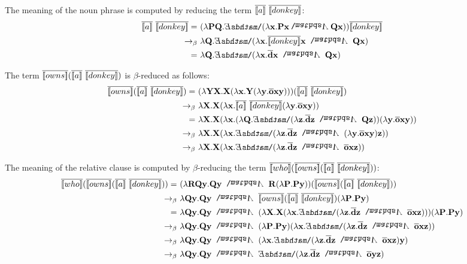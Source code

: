 The meaning of the noun phrase  is computed by reducing the term $\overline{[\![a]\!]} \ \overline{[\![donkey]\!]} $:
\begin{align*}
 \tr{\I{a}} \ \tr{\I{donkey}}   = \ & (\lambda \P2 \Q2. \ex2 (\lambda \x2.  \P2 \x2 \cnj2 \Q2 \x2 ) ) \tr{\I{donkey}}   \\
 \bconv \ &  \lambda  \Q2. \ex2 (\lambda \x2.  \tr{\I{donkey}} \x2 \ \cnj2 \ \Q2 \x2 ) \\
= \ &  \lambda  \Q2. \ex2 (\lambda \x2.  \tr{\cdonkey} \x2 \ \cnj2 \ \Q2 \x2 )
\end{align*}

The term $ \tr{\I{owns}}  (\tr{\I{a}} \ \tr{\I{donkey}}) $ is $\beta$-reduced as follows:
\begin{align*}
\tr{\I{owns}}  (\tr{\I{a}} \ \tr{\I{donkey}} ) = \ & ( \lambda \Y2 \X2. \X2 ( \lambda \x2. \Y2 (\lambda \y2.  \tr{\cown}  \x2 \y2 )))  (\tr{\I{a}} \ \tr{\I{donkey}} ) \\
\bconv \ &   \lambda \X2. \X2 ( \lambda \x2. \tr{\I{a}} \ \tr{\I{donkey}} (\lambda \y2.  \tr{\cown}  \x2 \y2 ))   \\
= \ &  \lambda \X2. \X2 ( \lambda \x2. ( \lambda  \Q2. \ex2 (\lambda \z2.  \tr{\cdonkey} \z2 \ \cnj2 \ \Q2 \z2 ) ) (\lambda \y2.  \tr{\cown}  \x2 \y2 ))   \\
\bconv \ &  \lambda \X2. \X2 ( \lambda \x2. \ex2 (\lambda \z2.  \tr{\cdonkey} \z2 \ \cnj2 \ (\lambda \y2.  \tr{\cown}  \x2 \y2 ) \z2   ))   \\
\bconv \ & \lambda \X2. \X2 ( \lambda \x2.  \ex2 (\lambda \z2. \tr{\cdonkey}  \z2 \ \cnj2  \ \tr{\cown}  \x2 \z2 ))  
\end{align*}

The meaning of the relative clause  is computed by $\beta$-reducing the term $\tr{\I{who}}  (\tr{\I{owns}}  (\tr{\I{a}} \ \tr{\I{donkey}} ))$:
\begin{align*}
 \tr{\I{who}}  (\tr{\I{owns}}  (\tr{\I{a}} \ \tr{\I{donkey}} )) = \ & (\lambda \R2 \Q2 \y2.  \Q2 \y2 \ \cnj2 \ \R2 (\lambda \P2. \P2 \y2 ) ) (\tr{\I{owns}}  (\tr{\I{a}} \ \tr{\I{donkey}} )) \\
\bconv \ &  \lambda \Q2 \y2. \Q2 \y2 \ \cnj2 \ \tr{\I{owns}}  (\tr{\I{a}} \ \tr{\I{donkey}}) (\lambda \P2. \P2 \y2)   \\
= \ & \lambda \Q2 \y2. \Q2 \y2 \ \cnj2 \ ( \lambda \X2. \X2 ( \lambda \x2.  \ex2 (\lambda \z2.  \tr{\cdonkey}  \z2 \ \cnj2  \ \tr{\cown}  \x2 \z2 ) ) )  (\lambda \P2. \P2 \y2)   \\
\bconv \ & \lambda \Q2 \y2.  \Q2 \y2 \ \cnj2 \ ( \lambda \P2. \P2 \y2) ( \lambda \x2.  \ex2 (\lambda \z2.  \tr{\cdonkey}  \z2 \ \cnj2  \ \tr{\cown}  \x2 \z2 ) )     \\
\bconv \ & \lambda \Q2 \y2. \Q2 \y2 \ \cnj2 \ (   \lambda \x2.  \ex2 (\lambda \z2.   \tr{\cdonkey}  \z2 \ \cnj2  \ \tr{\cown}  \x2 \z2)    \y2)   \\
\bconv \ & \lambda \Q2 \y2.  \Q2 \y2 \ \cnj2 \  \ex2 (\lambda \z2.  \tr{\cdonkey}  \z2 \ \cnj2  \ \tr{\cown}  \y2 \z2  ) 
\end{align*}

